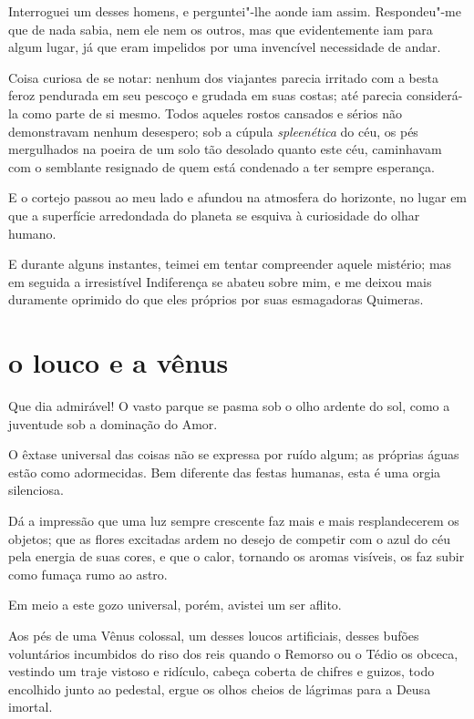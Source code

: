 Interroguei um desses homens, e perguntei"-lhe aonde iam assim.
Respondeu"-me que de nada sabia, nem ele nem os outros, mas que
evidentemente iam para algum lugar, já que eram impelidos por uma invencível
necessidade de andar.

Coisa curiosa de se notar: nenhum dos viajantes parecia irritado com a
besta feroz pendurada em seu pescoço e grudada em suas costas;
até parecia considerá-la como parte de si mesmo. Todos
aqueles rostos cansados e sérios não demonstravam nenhum desespero; sob a
cúpula \textit{spleenética} do céu, os pés mergulhados na poeira de um solo
tão desolado quanto este céu, caminhavam com o semblante
resignado de quem está condenado a ter sempre esperança.

E o cortejo passou ao meu lado e afundou na atmosfera do horizonte, no
lugar em que a superfície arredondada do planeta se esquiva à
curiosidade do olhar humano.

E durante alguns instantes, teimei em tentar compreender aquele mistério;
mas em seguida a irresistível Indiferença se abateu sobre mim, e me
deixou mais duramente oprimido do que eles próprios por suas
esmagadoras Quimeras.

\quebra\section[O louco e a vênus]{o louco e a vênus}

Que dia admirável! O vasto parque se pasma sob o olho ardente do sol,
como a juventude sob a dominação do Amor.

O êxtase universal das coisas não se expressa por ruído algum; as
próprias águas estão como adormecidas. Bem diferente das festas
humanas, esta é uma orgia silenciosa.

Dá a impressão que uma luz sempre crescente faz mais e mais
resplandecerem os objetos; que as flores excitadas ardem no desejo de
competir com o azul do céu pela energia de suas cores, e que o calor,
tornando os aromas visíveis, os faz subir como fumaça rumo ao astro.

Em meio a este gozo universal, porém, avistei um ser aflito.

Aos pés de uma Vênus colossal, um desses loucos artificiais, desses
bufões voluntários incumbidos do riso dos reis quando o Remorso ou o
Tédio os obceca, vestindo um traje vistoso e ridículo, cabeça
coberta de chifres e guizos, todo encolhido junto ao pedestal, ergue os
olhos cheios de lágrimas para a Deusa imortal.

